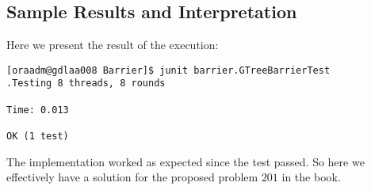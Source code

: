 \subsection{Sample Results and Interpretation}
\par
Here we present the result of the execution:
\par
\hfill
\begin{verbatim}
[oraadm@gdlaa008 Barrier]$ junit barrier.GTreeBarrierTest
.Testing 8 threads, 8 rounds

Time: 0.013

OK (1 test)
\end{verbatim}
\hfill
\par
The implementation worked as expected since the test passed. So here we
effectively have a solution for the proposed problem $201$ in the book.
